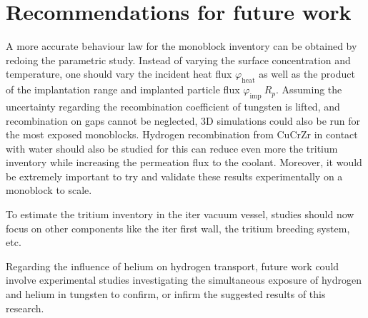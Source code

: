 \section*{Recommendations for future work}

A more accurate behaviour law for the monoblock inventory can be obtained by redoing the parametric study.
Instead of varying the surface concentration and temperature, one should vary the incident heat flux $\varphi_\mathrm{heat}$ as well as the product of the implantation range and implanted particle flux $\varphi_\mathrm{imp} \ R_p$.
Assuming the uncertainty regarding the recombination coefficient of tungsten is lifted, and recombination on gaps cannot be neglected, 3D simulations could also be run for the most exposed monoblocks.
Hydrogen recombination from CuCrZr in contact with water should also be studied for this can reduce even more the tritium inventory while increasing the \gls{permeation} flux to the coolant.
Moreover, it would be extremely important to try and validate these results experimentally on a monoblock to scale.

To estimate the tritium inventory in the \gls{iter} vacuum vessel, studies should now focus on other components like the \gls{iter} \gls{first wall}, the tritium breeding system, etc.

Regarding the influence of helium on hydrogen transport, future work could involve experimental studies investigating the simultaneous exposure of hydrogen and helium in tungsten to confirm, or infirm the suggested results of this research.


